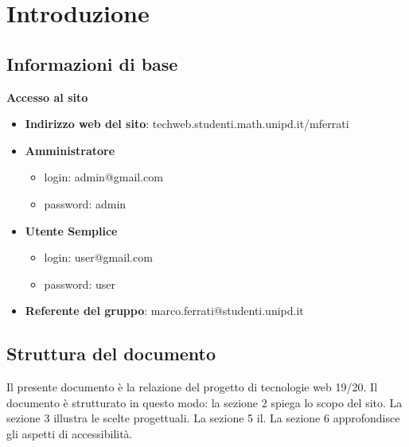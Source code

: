 \documentclass[1_relazione.tex]{subfiles}
\begin{document}
\section{Introduzione}

\subsection{Informazioni di base}
\textbf{Accesso al sito}

\begin{itemize}
\item \textbf{Indirizzo web del sito}: techweb.studenti.math.unipd.it/mferrati 
\item \textbf{Amministratore}
	\begin{itemize}
	\item login: admin@gmail.com
	\item password: admin
	\end{itemize}
\item \textbf{Utente Semplice}
	\begin{itemize}
	\item login: user@gmail.com
	\item password: user
	\end{itemize}
\item \textbf{Referente del gruppo}: marco.ferrati@studenti.unipd.it 
\end{itemize}

\subsection{Struttura del documento}
Il presente documento è la relazione del progetto di tecnologie web 19/20. Il documento è strutturato in questo modo: la sezione 2 spiega lo scopo del sito. La sezione 3 illustra le scelte progettuali. La sezione 5 il. La sezione 6 approfondisce gli aspetti di accessibilità. 
\end{document}
